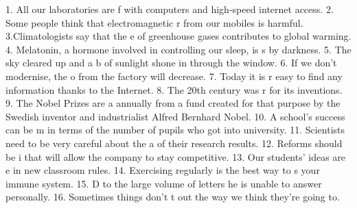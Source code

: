 1. All our laboratories are f\underline{\hspace{2cm}} with computers and high-speed
internet access. 2. Some people think that electromagnetic r\underline{\hspace{2cm}}
from our mobiles is harmful. 3.Climatologists say that the e\underline{\hspace{2cm}}
of greenhouse gases contributes to global warming. 4. Melatonin, a hormone involved in
controlling our sleep, is s\underline{\hspace{2cm}} by darkness. 5. The sky cleared up
and a b\underline{\hspace{2cm}} of sunlight shone in through the window. 6. If we don’t
modernise, the o\underline{\hspace{2cm}} from the factory will decrease. 7. Today it is
r\underline{\hspace{2cm}} easy to find any information thanks to the Internet. 8. The
20th century was r\underline{\hspace{2cm}} for its inventions. 9. The Nobel Prizes are
a\underline{\hspace{2cm}} annually from a fund created for that purpose by the Swedish
inventor and industrialist Alfred Bernhard Nobel. 10. A school’s success can be
m\underline{\hspace{2cm}} in terms of the number of pupils who got into university.
11. Scientists need to be very careful about the a\underline{\hspace{2cm}} of their
research results. 12. Reforms should be i\underline{\hspace{2cm}} that will allow the
company to stay competitive. 13. Our students’ ideas are e\underline{\hspace{2cm}} in
new classroom rules. 14. Exercising regularly is the best way to s\underline{\hspace{2cm}}
your immune system. 15. D\underline{\hspace{2cm}} to the large volume of letters he is
unable to answer personally. 16. Sometimes things don't t\underline{\hspace{2cm}} out
the way we think they're going to.

